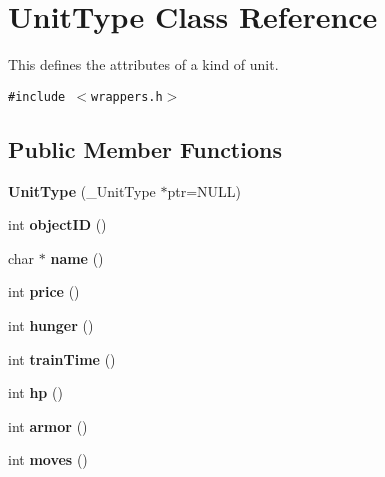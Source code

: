 \hypertarget{classUnitType}{
\section{UnitType Class Reference}
\label{classUnitType}
}
This defines the attributes of a kind of unit.  


{\tt \#include $<$wrappers.h$>$}

\subsection*{Public Member Functions}
\begin{CompactItemize}
\item 
\hypertarget{classUnitType_416de534d56d49a3019fa9b2601d10f9}{
\textbf{UnitType} (\_\-UnitType $\ast$ptr=NULL)}
\label{classUnitType_416de534d56d49a3019fa9b2601d10f9}

\item 
\hypertarget{classUnitType_a153f6427546ef11334b64e44e49740a}{
int \textbf{objectID} ()}
\label{classUnitType_a153f6427546ef11334b64e44e49740a}

\item 
\hypertarget{classUnitType_3908d7cf5e0b5a2cb60b8516225e7c59}{
char $\ast$ \textbf{name} ()}
\label{classUnitType_3908d7cf5e0b5a2cb60b8516225e7c59}

\item 
\hypertarget{classUnitType_09f8d620a03f63bf063935df712c9f57}{
int \textbf{price} ()}
\label{classUnitType_09f8d620a03f63bf063935df712c9f57}

\item 
\hypertarget{classUnitType_2981e06eb4d6537fb8ca775ea20033c9}{
int \textbf{hunger} ()}
\label{classUnitType_2981e06eb4d6537fb8ca775ea20033c9}

\item 
\hypertarget{classUnitType_f8f27eea3e3c5284ba1509164c75ed96}{
int \textbf{trainTime} ()}
\label{classUnitType_f8f27eea3e3c5284ba1509164c75ed96}

\item 
\hypertarget{classUnitType_310873153e2b3c8aed99ca087974b59c}{
int \textbf{hp} ()}
\label{classUnitType_310873153e2b3c8aed99ca087974b59c}

\item 
\hypertarget{classUnitType_0f50024671abefed34ccc2636c73025c}{
int \textbf{armor} ()}
\label{classUnitType_0f50024671abefed34ccc2636c73025c}

\item 
\hypertarget{classUnitType_71686e035dcd8cfaf8eecaed61692502}{
int \textbf{moves} ()}
\label{classUnitType_71686e035dcd8cfaf8eecaed61692502}


\end{CompactItemize}
